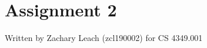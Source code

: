 \documentclass[twoside,12pt,a4paper,english]{memoir}
\begin{document}
\chapter{Assignment 2}
Written by Zachary Leach (zcl190002) for CS 4349.001 \\
 



 

\end{document}
